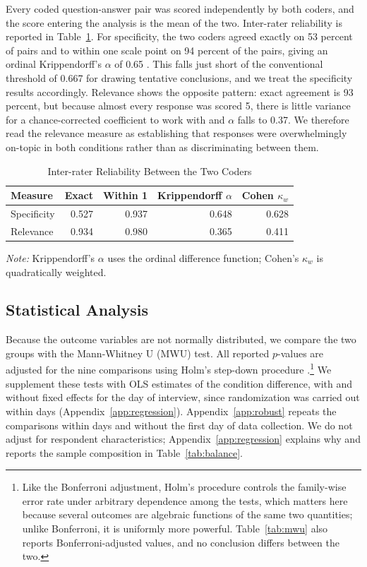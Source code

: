 \documentclass[12pt]{article}
\begin{document}
Every coded question-answer pair was scored independently by both coders, and the score entering the analysis is the mean of the two. Inter-rater reliability is reported in Table~\ref{tab:irr}. For specificity, the two coders agreed exactly on 53 percent of pairs and to within one scale point on 94 percent of the pairs, giving an ordinal Krippendorff's $\alpha$ of 0.65 \citep{Krippendorff2012}. This falls just short of the conventional threshold of 0.667 for drawing tentative conclusions, and we treat the specificity results accordingly. Relevance shows the opposite pattern: exact agreement is 93 percent, but because almost every response was scored 5, there is little variance for a chance-corrected coefficient to work with and $\alpha$ falls to 0.37. We therefore read the relevance measure as establishing that responses were overwhelmingly on-topic in both conditions rather than as discriminating between them.

\begin{table}[H]
\centering
\caption{Inter-rater Reliability Between the Two Coders}
\label{tab:irr}
\begin{tabularx}{\textwidth}{Xrrrr}
\toprule
\textbf{Measure} & \textbf{Exact} & \textbf{Within 1} &
  \textbf{Krippendorff $\alpha$} & \textbf{Cohen $\kappa_w$} \\
\midrule
Specificity & 0.527 & 0.937 & 0.648 & 0.628 \\
Relevance   & 0.934 & 0.980 & 0.365 & 0.411 \\
\bottomrule
\end{tabularx}
\smallskip
\parbox{\textwidth}{\singlespacing\small \textit{Note:} Krippendorff's $\alpha$ uses the ordinal
difference function; Cohen's $\kappa_w$ is quadratically weighted.}
\end{table}

\subsection*{Statistical Analysis}

Because the outcome variables are not normally distributed, we compare the two groups with the Mann-Whitney U (MWU) test. All reported $p$-values are adjusted for the nine comparisons using Holm's step-down procedure \citep{Holm1979}.\footnote{Like the Bonferroni adjustment, Holm's procedure controls the family-wise error rate under arbitrary dependence among the tests, which matters here because several outcomes are algebraic functions of the same two quantities; unlike Bonferroni, it is uniformly more powerful. Table~\ref{tab:mwu} also reports Bonferroni-adjusted values, and no conclusion differs between the two.} We supplement these tests with OLS estimates of the condition difference, with and without fixed effects for the day of interview, since randomization was carried out within days (Appendix~\ref{app:regression}). Appendix~\ref{app:robust} repeats the comparisons within days and without the first day of data collection. We do not adjust for respondent characteristics; Appendix~\ref{app:regression} explains why and reports the sample composition in Table~\ref{tab:balance}.
\end{document}
